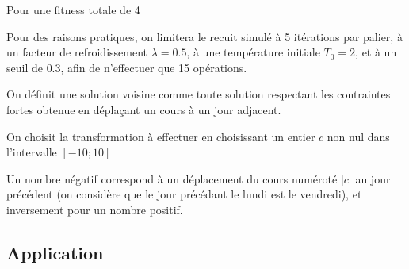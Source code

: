 Pour une fitness totale de 4

Pour des raisons pratiques, on limitera le recuit simulé à 5 itérations par palier, à un facteur de refroidissement $\lambda = 0.5$, à une température initiale $T_0 = 2$, et à un seuil de $0.3$, afin de n'effectuer que 15 opérations.

On définit une solution voisine comme toute solution respectant les contraintes fortes obtenue en déplaçant un cours à un jour adjacent.

On choisit la transformation à effectuer en choisissant un entier $c$ non nul dans l'intervalle $[-10;10]$

Un nombre négatif correspond à un déplacement du cours numéroté $|c|$ au jour précédent (on considère que le jour précédant le lundi est le vendredi), et inversement pour un nombre positif.

\subsection {Application}

